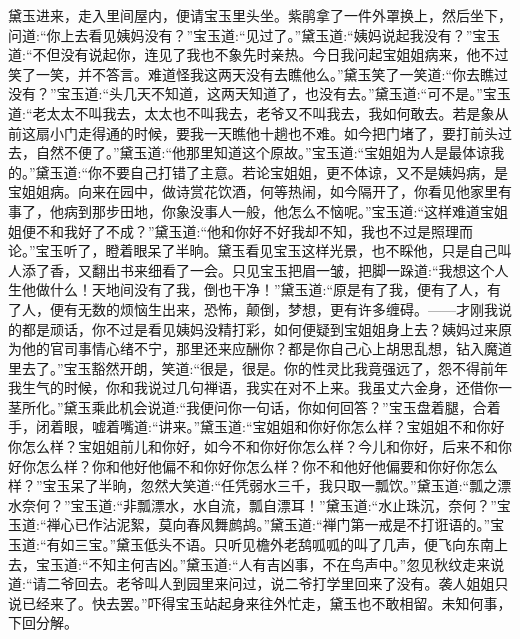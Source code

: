 \begin{parag}
    黛玉进来，走入里间屋内，便请宝玉里头坐。紫鹃拿了一件外罩换上，然后坐下，问道:“你上去看见姨妈没有？”宝玉道:“见过了。”黛玉道:“姨妈说起我没有？”宝玉道:“不但没有说起你，连见了我也不象先时亲热。今日我问起宝姐姐病来，他不过笑了一笑，并不答言。难道怪我这两天没有去瞧他么。”黛玉笑了一笑道:“你去瞧过没有？”宝玉道:“头几天不知道，这两天知道了，也没有去。”黛玉道:“可不是。”宝玉道:“老太太不叫我去，太太也不叫我去，老爷又不叫我去，我如何敢去。若是象从前这扇小门走得通的时候，要我一天瞧他十趟也不难。如今把门堵了，要打前头过去，自然不便了。”黛玉道:“他那里知道这个原故。”宝玉道:“宝姐姐为人是最体谅我的。”黛玉道:“你不要自己打错了主意。若论宝姐姐，更不体谅，又不是姨妈病，是宝姐姐病。向来在园中，做诗赏花饮酒，何等热闹，如今隔开了，你看见他家里有事了，他病到那步田地，你象没事人一般，他怎么不恼呢。”宝玉道:“这样难道宝姐姐便不和我好了不成？”黛玉道:“他和你好不好我却不知，我也不过是照理而论。”宝玉听了，瞪着眼呆了半晌。黛玉看见宝玉这样光景，也不睬他，只是自己叫人添了香，又翻出书来细看了一会。只见宝玉把眉一皱，把脚一跺道:“我想这个人生他做什么！天地间没有了我，倒也干净！”黛玉道:“原是有了我，便有了人，有了人，便有无数的烦恼生出来，恐怖，颠倒，梦想，更有许多缠碍。——才刚我说的都是顽话，你不过是看见姨妈没精打彩，如何便疑到宝姐姐身上去？姨妈过来原为他的官司事情心绪不宁，那里还来应酬你？都是你自己心上胡思乱想，钻入魔道里去了。”宝玉豁然开朗，笑道:“很是，很是。你的性灵比我竟强远了，怨不得前年我生气的时候，你和我说过几句禅语，我实在对不上来。我虽丈六金身，还借你一茎所化。”黛玉乘此机会说道:“我便问你一句话，你如何回答？”宝玉盘着腿，合着手，闭着眼，嘘着嘴道:“讲来。”黛玉道:“宝姐姐和你好你怎么样？宝姐姐不和你好你怎么样？宝姐姐前儿和你好，如今不和你好你怎么样？今儿和你好，后来不和你好你怎么样？你和他好他偏不和你好你怎么样？你不和他好他偏要和你好你怎么样？”宝玉呆了半晌，忽然大笑道:“任凭弱水三千，我只取一瓢饮。”黛玉道:“瓢之漂水奈何？”宝玉道:“非瓢漂水，水自流，瓢自漂耳！”黛玉道:“水止珠沉，奈何？”宝玉道:“禅心已作沾泥絮，莫向春风舞鹧鸪。”黛玉道:“禅门第一戒是不打诳语的。”宝玉道:“有如三宝。”黛玉低头不语。只听见檐外老鸹呱呱的叫了几声，便飞向东南上去，宝玉道:“不知主何吉凶。”黛玉道:“人有吉凶事，不在鸟声中。”忽见秋纹走来说道:“请二爷回去。老爷叫人到园里来问过，说二爷打学里回来了没有。袭人姐姐只说已经来了。快去罢。”吓得宝玉站起身来往外忙走，黛玉也不敢相留。未知何事，下回分解。
\end{parag}